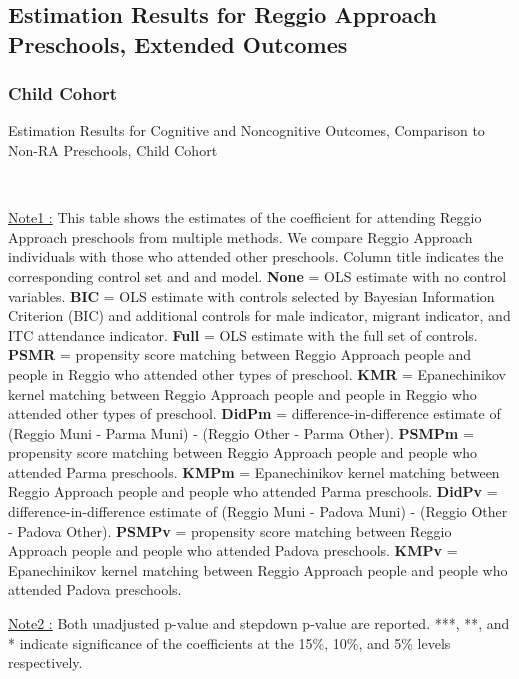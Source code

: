 \subsection{Estimation Results for Reggio Approach Preschools, Extended Outcomes}  \label{appsec:extended-outcome}
\subsubsection{Child Cohort}
\begin{table}[H] \caption{Estimation Results for Cognitive and Noncognitive Outcomes, Comparison to Non-RA Preschools, Child Cohort} \label{combined_child_CN_Other}
\scalebox{0.59}{}
\vspace{1ex} \\
\footnotesize\raggedright{\underline{Note1 :} This table shows the estimates of the coefficient for attending Reggio Approach preschools from multiple methods. We compare Reggio Approach individuals with those who attended other preschools. Column title indicates the corresponding control set and and model. \textbf{None} = OLS estimate with no control variables. \textbf{BIC} = OLS estimate with controls selected by Bayesian Information Criterion (BIC) and additional controls for male indicator, migrant indicator, and ITC attendance indicator. \textbf{Full} = OLS estimate with the full set of controls. \textbf{PSMR} =  propensity score matching between Reggio Approach people and people in Reggio who attended other types of preschool. \textbf{KMR} = Epanechinikov kernel matching between Reggio Approach people and people in Reggio who attended other types of preschool. \textbf{DidPm} = difference-in-difference estimate of (Reggio Muni - Parma Muni) - (Reggio Other - Parma Other). \textbf{PSMPm} = propensity score matching between Reggio Approach people and people who attended Parma preschools. \textbf{KMPm} = Epanechinikov kernel matching between Reggio Approach people and people who attended Parma preschools. \textbf{DidPv} = difference-in-difference estimate of (Reggio Muni - Padova Muni) - (Reggio Other - Padova Other). \textbf{PSMPv} = propensity score matching between Reggio Approach people and people who attended Padova preschools. \textbf{KMPv} = Epanechinikov kernel matching between Reggio Approach people and people who attended Padova preschools.} 

\footnotesize\raggedright{\underline{Note2 :} Both unadjusted p-value and stepdown p-value are reported. ***, **, and * indicate significance of the coefficients at the 15\%, 10\%, and 5\% levels respectively.}
\end{table}


